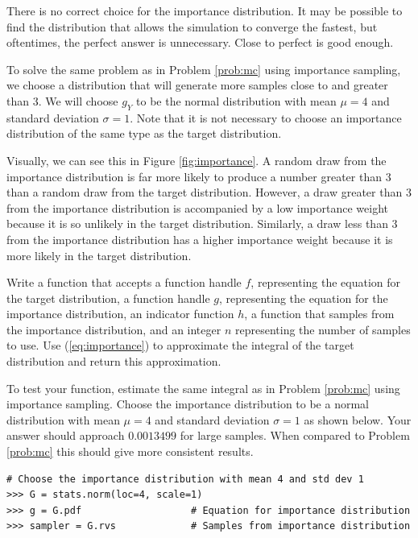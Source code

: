 There is no correct choice for the importance distribution.
It may be possible to find the distribution that allows the simulation to converge the fastest, but oftentimes, the perfect answer is unnecessary.
Close to perfect is good enough.

To solve the same problem as in Problem \ref{prob:mc} using importance sampling, we choose a distribution that will generate more samples close to and greater than 3.
We will choose $g_Y$ to be the normal distribution with mean $\mu = 4$ and standard deviation $\sigma = 1$.
Note that it is not necessary to choose an importance distribution of the same type as the target distribution.

Visually, we can see this in Figure \ref{fig:importance}.
A random draw from the importance distribution is far more likely to produce a number greater than 3 than a random draw from the target distribution.
However, a draw greater than 3 from the importance distribution is accompanied by a low importance weight because it is so unlikely in the target distribution.
Similarly, a draw less than 3 from the importance distribution has a higher importance weight because it is more likely in the target distribution.

\newpage

\begin{problem} \label{prob:mc_important}
Write a function that accepts a function handle $f$, representing the equation for the target distribution, a function handle $g$, representing the equation for the importance distribution, an indicator function $h$, a function that samples from the importance distribution, and an integer $n$ representing the number of samples to use.
Use (\ref{eq:importance}) to approximate the integral of the target distribution and return this approximation.

To test your function, estimate the same integral as in Problem \ref{prob:mc} using importance sampling.
Choose the importance distribution to be a normal distribution with mean $\mu = 4$ and standard deviation $\sigma = 1$ as shown below.
Your answer should approach $0.0013499$ for large samples.
When compared to Problem \ref{prob:mc} this should give more consistent results.

\begin{lstlisting}
# Choose the importance distribution with mean 4 and std dev 1
>>> G = stats.norm(loc=4, scale=1)
>>> g = G.pdf                   # Equation for importance distribution
>>> sampler = G.rvs             # Samples from importance distribution
\end{lstlisting}

\end{problem}

